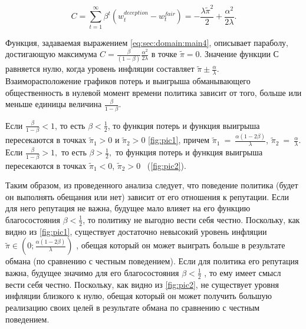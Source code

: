 \begin{equation}
	\label{eq:sec:domain:main4}
C=\sum_{t=1}^{\infty} \beta^t(w^{deception}_t - w^{fair}_t) = -\frac{\lambda\tilde{\pi}^2}{2}+\frac{\alpha^2}{2\lambda}.
\end{equation}



Функция, задаваемая выражением \eqref{eq:sec:domain:main4}, описывает параболу, достигающую максимума $C=\frac{\beta}{(1-\beta)}\frac{\alpha^2}{2\lambda} $  в точке   $\tilde{\pi}=0$. Значение функции $С$ равняется нулю, когда уровень инфляции составляет $\tilde{\pi}\pm\frac{\alpha}{\lambda}$.
\\



Взаиморасположение графиков потерь и выигрыша обманывающего общественность в нулевой момент времени политика зависит от того, больше или меньше единицы величина $\frac{\beta}{1-\beta}$.

Если   $\frac{\beta}{1-\beta}<1$, то есть  $\beta<\frac{1}{2}$, то функция потерь и функция выигрыша пересекаются в точках  $\tilde{\pi}_1>0$ и $\tilde{\pi}_2>0$ \eqref{fig:pic1}, причем  $\tilde{\pi}_1~=~\frac{\alpha(1-2\beta)}{\lambda}$, $\tilde{\pi}_2~=~\frac{\alpha}{\lambda}$. \\
Если  $\frac{\beta}{1-\beta}>1,$  то есть  $\beta>\frac{1}{2},$  то функция потерь и функция выигрыша пересекаются в точках   $\tilde{\pi}_1<0$, $\tilde{\pi}_2>0$ ~(\ref{fig:pic2}).

Таким образом, из проведенного анализа следует, что поведение политика (будет он выполнять обещания или нет) зависит от его отношения к репутации. Если для него репутация не важна, будущее мало влияет на его функцию благосостояния $\beta<\frac{1}{2}$, то политику не выгодно вести себя честно. Поскольку, как видно из \eqref{fig:pic1}, существует достаточно невысокий уровень инфляции $\tilde{\pi}\in\left(0;\frac{\alpha(1-2\beta)}{\lambda} \right)$ , обещая который он может выиграть больше в результате обмана (по сравнению с честным поведением). Если для политика его репутация важна, будущее значимо для его благосостояния $\beta<\frac{1}{2}$ , то ему имеет смысл вести себя честно. Поскольку, как видно из \eqref{fig:pic2}, не существует уровня инфляции близкого к нулю, обещая который он может получить большую реализацию своих целей в результате обмана по сравнению с честным поведением.